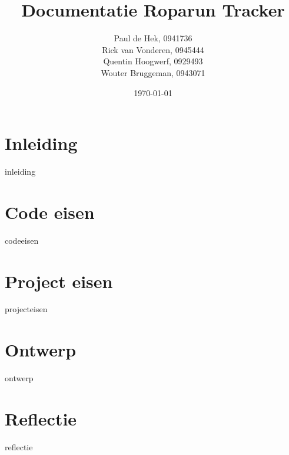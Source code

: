 \documentclass[12pt, a4paper]{article}
\date{\today}
\title{\textbf{Documentatie Roparun Tracker}}
\author{
	Paul de Hek, 0941736 \\
	Rick van Vonderen, 0945444 \\
	Quentin Hoogwerf, 0929493 \\
	Wouter Bruggeman, 0943071 \\
}
\begin{document}
	\maketitle
	\thispagestyle{empty}
	\newpage

	\tableofcontents
	\setcounter{page}{1}
	\newpage

	\section{Inleiding}
	{inleiding}
	\newpage

	\section{Code eisen}
	{codeeisen}
	\newpage

	\section{Project eisen}
	{projecteisen}
	\newpage

	\section{Ontwerp}
	{ontwerp}
	\newpage

	\section{Reflectie}
	{reflectie}
	\newpage
\end{document}

